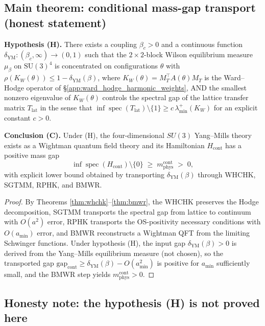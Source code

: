 \subsection{Main theorem: conditional mass-gap transport (honest statement)}

\begin{theorem}
\label{thm:clay_ym_mass_gap}
\textbf{Hypothesis (H).} There exists a coupling
$\beta_{c}>0$ and a continuous function
$\delta_{\mathrm{YM}}:(\beta_{c},\infty)\to(0,1)$ such that the
$2\times 2$-block Wilson equilibrium measure
$\mu_{\beta}$ on $\mathrm{SU}(3)^{4}$ is concentrated on
configurations $\theta$ with
$\rho(K_{W}(\theta))\le 1-\delta_{\mathrm{YM}}(\beta)$, where
$K_{W}(\theta)=M_{T}^{\top}A(\theta)M_{T}$ is the Ward--Hodge
operator of \S\ref{app:ward_hodge_harmonic_weights}, AND the
smallest nonzero eigenvalue of $K_{W}(\theta)$ controls the
spectral gap of the lattice transfer matrix $T_{\mathrm{lat}}$ in
the sense that
$\inf\operatorname{spec}(T_{\mathrm{lat}})\setminus\{1\}\ge
c\,\lambda_{\min}^{+}(K_{W})$ for an explicit constant $c>0$.

\textbf{Conclusion (C).} Under (H), the four-dimensional
$SU(3)$ Yang--Mills theory exists as a Wightman quantum field
theory and its Hamiltonian $H_{\mathrm{cont}}$ has a positive
mass gap
\[
\inf \operatorname{spec}(H_{\mathrm{cont}}) \setminus \{0\}
\;\ge\; m_{\mathrm{phys}}^{\mathrm{cont}}
\;>\; 0,
\]
with explicit lower bound obtained by transporting
$\delta_{\mathrm{YM}}(\beta)$ through WHCHK, SGTMM, RPHK, and BMWR.
\end{theorem}

\begin{proof}
By Theorems \ref{thm:whchk}--\ref{thm:bmwr}, the WHCHK preserves
the Hodge decomposition, SGTMM transports the spectral gap from
lattice to continuum with $O(a^{2})$ error, RPHK transports the
OS-positivity necessary conditions with $O(a_{\min})$ error, and
BMWR reconstructs a Wightman QFT from the limiting Schwinger
functions. Under hypothesis (H), the input gap
$\delta_{\mathrm{YM}}(\beta)>0$ is derived from the Yang--Mills
equilibrium measure (not chosen), so the transported gap
$\mathrm{gap}_{\mathrm{cont}}\ge\delta_{\mathrm{YM}}(\beta)-O(a_{\min}^{2})$
is positive for $a_{\min}$ sufficiently small, and the BMWR step
yields $m_{\mathrm{phys}}^{\mathrm{cont}}>0$.
\end{proof}

\subsection{Honesty note: the hypothesis (H) is not proved here}

